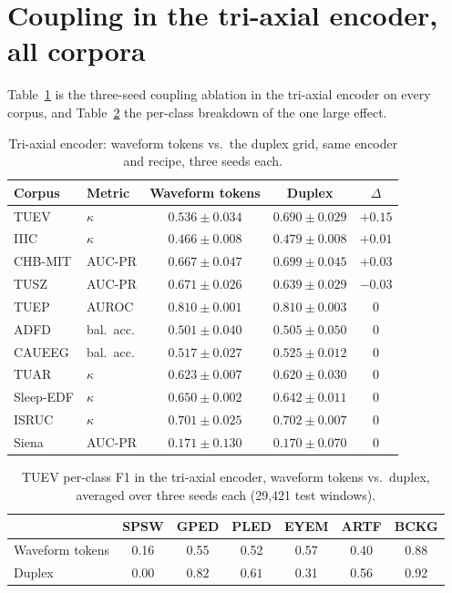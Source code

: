 
\section{Coupling in the tri-axial encoder, all corpora}
\label{app:triaxial-coupling}

Table~\ref{tab:coupling-triaxial} is the three-seed coupling ablation in
the tri-axial encoder on every corpus, and Table~\ref{tab:perclass} the
per-class breakdown of the one large effect.

\begin{table}[h]
\centering
\small
\caption{Tri-axial encoder: waveform tokens vs.\ the duplex grid, same
encoder and recipe, three seeds each.}
\label{tab:coupling-triaxial}
\begin{tabular}{llccc}
\toprule
Corpus & Metric & Waveform tokens & Duplex & $\Delta$ \\
\midrule
TUEV & $\kappa$ & $0.536 \pm 0.034$ & $0.690 \pm 0.029$ & $\mathbf{+0.15}$ \\
IIIC & $\kappa$ & $0.466 \pm 0.008$ & $0.479 \pm 0.008$ & $+0.01$ \\
CHB-MIT & AUC-PR & $0.667 \pm 0.047$ & $0.699 \pm 0.045$ & $+0.03$ \\
TUSZ & AUC-PR & $0.671 \pm 0.026$ & $0.639 \pm 0.029$ & $-0.03$ \\
TUEP & AUROC & $0.810 \pm 0.001$ & $0.810 \pm 0.003$ & $0$ \\
ADFD & bal.\ acc. & $0.501 \pm 0.040$ & $0.505 \pm 0.050$ & $0$ \\
CAUEEG & bal.\ acc. & $0.517 \pm 0.027$ & $0.525 \pm 0.012$ & $0$ \\
TUAR & $\kappa$ & $0.623 \pm 0.007$ & $0.620 \pm 0.030$ & $0$ \\
Sleep-EDF & $\kappa$ & $0.650 \pm 0.002$ & $0.642 \pm 0.011$ & $0$ \\
ISRUC & $\kappa$ & $0.701 \pm 0.025$ & $0.702 \pm 0.007$ & $0$ \\
Siena & AUC-PR & $0.171 \pm 0.130$ & $0.170 \pm 0.070$ & $0$ \\
\bottomrule
\end{tabular}
\end{table}

\begin{table}[h]
\centering
\small
\caption{TUEV per-class F1 in the tri-axial encoder, waveform tokens vs.\
duplex, averaged over three seeds each (29,421 test windows).}
\label{tab:perclass}
\begin{tabular}{lcccccc}
\toprule
 & SPSW & GPED & PLED & EYEM & ARTF & BCKG \\
\midrule
Waveform tokens & 0.16 & 0.55 & 0.52 & 0.57 & 0.40 & 0.88 \\
Duplex & 0.00 & $\mathbf{0.82}$ & $\mathbf{0.61}$ & 0.31 & 0.56 & 0.92 \\
\bottomrule
\end{tabular}
\end{table}


